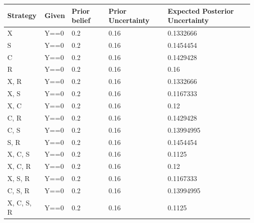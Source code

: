 \documentclass[12pt,]{book}
\newenvironment{Shaded}{\begin{snugshade}}{\end{snugshade}}
\newcommand{\CommentTok}[1]{\textcolor[rgb]{0.56,0.35,0.01}{\textit{#1}}}
\newcommand{\DataTypeTok}[1]{\textcolor[rgb]{0.13,0.29,0.53}{#1}}
\newcommand{\KeywordTok}[1]{\textcolor[rgb]{0.13,0.29,0.53}{\textbf{#1}}}
\newcommand{\NormalTok}[1]{#1}
\newcommand{\OperatorTok}[1]{\textcolor[rgb]{0.81,0.36,0.00}{\textbf{#1}}}
\newcommand{\OtherTok}[1]{\textcolor[rgb]{0.56,0.35,0.01}{#1}}
\newcommand{\StringTok}[1]{\textcolor[rgb]{0.31,0.60,0.02}{#1}}
\begin{document}
\begin{Shaded}
\end{Shaded}

\begin{tabular}{l|l|l|l|l}
\hline
Strategy & Given & Prior belief & Prior Uncertainty & Expected Posterior Uncertainty\\
\hline
X & Y==0 & 0.2 & 0.16 & 0.1332666\\
\hline
S & Y==0 & 0.2 & 0.16 & 0.1454454\\
\hline
C & Y==0 & 0.2 & 0.16 & 0.1429428\\
\hline
R & Y==0 & 0.2 & 0.16 & 0.16\\
\hline
X, R & Y==0 & 0.2 & 0.16 & 0.1332666\\
\hline
X, S & Y==0 & 0.2 & 0.16 & 0.1167333\\
\hline
X, C & Y==0 & 0.2 & 0.16 & 0.12\\
\hline
C, R & Y==0 & 0.2 & 0.16 & 0.1429428\\
\hline
C, S & Y==0 & 0.2 & 0.16 & 0.13994995\\
\hline
S, R & Y==0 & 0.2 & 0.16 & 0.1454454\\
\hline
X, C, S & Y==0 & 0.2 & 0.16 & 0.1125\\
\hline
X, C, R & Y==0 & 0.2 & 0.16 & 0.12\\
\hline
X, S, R & Y==0 & 0.2 & 0.16 & 0.1167333\\
\hline
C, S, R & Y==0 & 0.2 & 0.16 & 0.13994995\\
\hline
X, C, S, R & Y==0 & 0.2 & 0.16 & 0.1125\\
\hline
\end{tabular}
\end{document}
